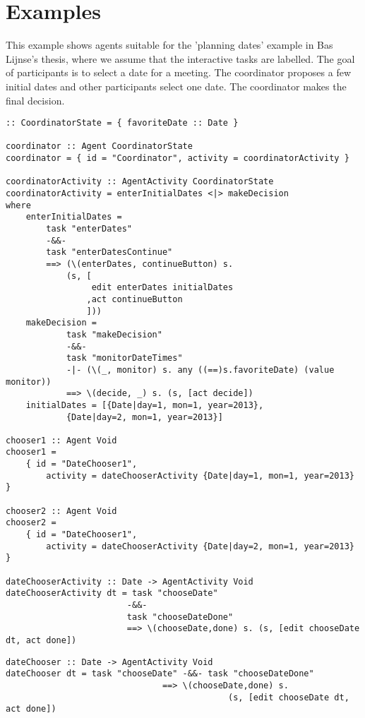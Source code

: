 \documentclass[english]{article}
\begin{document}
\section{Examples}

This example shows agents suitable for the 'planning dates' example in Bas Lijnse's thesis, where we assume that the interactive tasks are labelled. The goal of participants is to select a date for a meeting. The coordinator proposes a few initial dates and other participants select one date. The coordinator makes the final decision.

\begin{lstlisting}
:: CoordinatorState = { favoriteDate :: Date }

coordinator :: Agent CoordinatorState
coordinator = { id = "Coordinator", activity = coordinatorActivity }

coordinatorActivity :: AgentActivity CoordinatorState
coordinatorActivity = enterInitialDates <|> makeDecision	  
where
	enterInitialDates = 
		task "enterDates"
		-&&-
		task "enterDatesContinue"
		==> (\(enterDates, continueButton) s. 
			(s, [
			  	 edit enterDates initialDates
			    ,act continueButton
			  	]))
	makeDecision = 
			task "makeDecision"
			-&&-
			task "monitorDateTimes"
			-|- (\(_, monitor) s. any ((==)s.favoriteDate) (value monitor))
			==> \(decide, _) s. (s, [act decide])
	initialDates = [{Date|day=1, mon=1, year=2013},
			{Date|day=2, mon=1, year=2013}]
			  
chooser1 :: Agent Void
chooser1 = 
	{ id = "DateChooser1", 
		activity = dateChooserActivity {Date|day=1, mon=1, year=2013} }

chooser2 :: Agent Void
chooser2 = 
	{ id = "DateChooser1", 
		activity = dateChooserActivity {Date|day=2, mon=1, year=2013} }

dateChooserActivity :: Date -> AgentActivity Void
dateChooserActivity dt = task "chooseDate"
				 		-&&-
				 		task "chooseDateDone"
				 		==> \(chooseDate,done) s. (s, [edit chooseDate dt, act done])
\end{lstlisting}

\begin{lstlisting}
dateChooser :: Date -> AgentActivity Void
dateChooser dt = task "chooseDate" -&&- task "chooseDateDone"
							   ==> \(chooseDate,done) s.
							  				(s, [edit chooseDate dt, act done])
\end{lstlisting}
\end{document}
